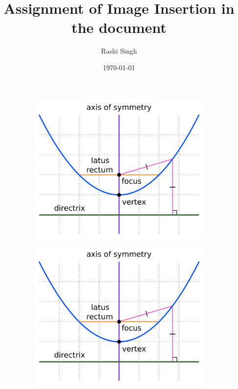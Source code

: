 \documentclass[10pt,twocolumn]{article}
\begin{document}
	\title{Assignment of Image Insertion in the document}
	\author{Rashi Singh}
	\date{\today}
	\maketitle
	\blindtext
	\begin{figure}[h]
		\centering
		\begin{subfigure}{0.2\textwidth}
			\includegraphics[width=1\textwidth,right]{parabola}
		\end{subfigure}
		\begin{subfigure}{0.2\textwidth}
			\includegraphics[width=1\textwidth,left]{parabola}

\end{subfigure}
\end{figure}
\end{document}
